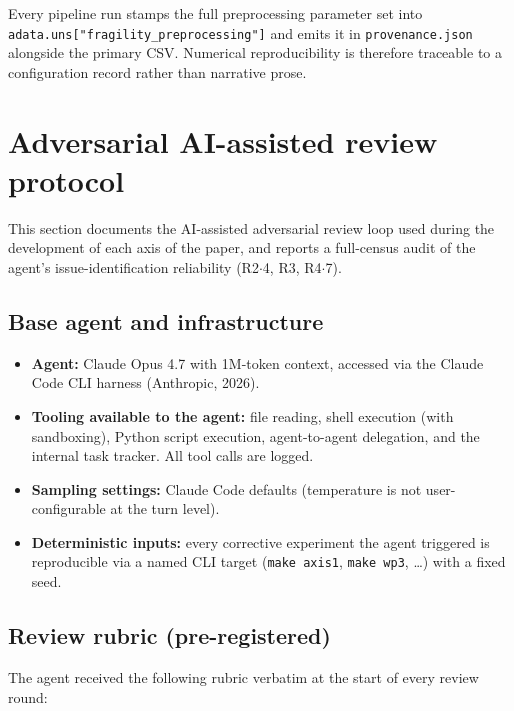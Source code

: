 \documentclass[a4paper,11pt]{article}
\begin{document}
Every pipeline run stamps the full preprocessing parameter set into
\texttt{adata.uns["fragility\_preprocessing"]} and emits it in
\texttt{provenance.json} alongside the primary CSV. Numerical
reproducibility is therefore traceable to a configuration record
rather than narrative prose.

\clearpage
\section{Adversarial AI-assisted review protocol}
\label{sec:supp_methods_s2}

This section documents the AI-assisted adversarial review loop used
during the development of each axis of the paper, and reports a
full-census audit of the agent's issue-identification reliability
(R2$\cdot$4, R3, R4$\cdot$7).

\subsection{Base agent and infrastructure}

\begin{itemize}
\item \textbf{Agent:} Claude Opus 4.7 with 1M-token context, accessed
  via the Claude Code CLI harness (Anthropic, 2026).
\item \textbf{Tooling available to the agent:} file reading, shell
  execution (with sandboxing), Python script execution, agent-to-agent
  delegation, and the internal task tracker. All tool calls are logged.
\item \textbf{Sampling settings:} Claude Code defaults (temperature is
  not user-configurable at the turn level).
\item \textbf{Deterministic inputs:} every corrective experiment the
  agent triggered is reproducible via a named CLI target
  (\texttt{make axis1}, \texttt{make wp3}, \ldots) with a fixed seed.
\end{itemize}

\subsection{Review rubric (pre-registered)}

The agent received the following rubric verbatim at the start of every
review round:
\end{document}
